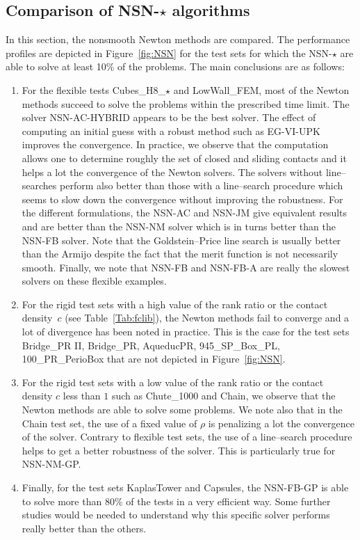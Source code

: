 \subsection{Comparison of {\sf NSN-$\star$} algorithms}

In this section,  the nonsmooth Newton methods  are compared.  The performance profiles are depicted in Figure~\ref{fig:NSN} for the test sets for which the {\sf NSN-$\star$} are able to solve at least 10\% of the problems. The main conclusions are as follows:
\begin{enumerate}
\item For the flexible tests Cubes\_H8\_$\star$ and LowWall\_FEM, most of the Newton methods succeed to solve the problems within the prescribed time limit. The solver {\sf NSN-AC-HYBRID} appears to be the best solver.  The effect of computing an initial guess with a robust method such as {\sf EG-VI-UPK}  improves the convergence. In practice, we observe that the computation allows one to determine roughly the set of closed and sliding contacts and it helps a lot the convergence of the Newton solvers. The solvers without line--searches perform also better than those with a line--search procedure which  seems to slow down the convergence without improving the robustness.  For the different formulations, the {\sf NSN-AC} and {\sf NSN-JM} give equivalent results and are better than the {\sf NSN-NM} solver which is in turns better than the {\sf NSN-FB} solver. Note that the Goldstein--Price line search is usually better than the Armijo despite the fact that the merit function is not necessarily smooth. Finally, we note that  {\sf NSN-FB}  and {\sf NSN-FB-A} are really the slowest solvers on these flexible examples.
\item For the rigid test sets with a high value of the rank ratio or the contact density~$c$ (see Table~\ref{Tab:fclib}), the Newton methods fail to converge and a lot of divergence has been noted in practice. This is the case for the test sets Bridge\_PR II, Bridge\_PR, AqueducPR, 945\_SP\_Box\_PL, 100\_PR\_PerioBox that are not depicted in Figure~\ref{fig:NSN}.
\item For the rigid test sets with a low value of the rank ratio or the contact density $c$ less than $1$ such as Chute\_1000 and Chain, we observe that the Newton methods are able to solve some problems. We note also that in the Chain test set, the use of a fixed value of $\rho$ is penalizing a lot the convergence of the solver. Contrary to flexible test sets, the use of a line--search procedure helps  to get a better robustness  of the solver. This is particularly true for {\sf NSN-NM-GP}.
\item Finally, for the test sets KaplasTower and Capsules, the {\sf NSN-FB-GP} is able to solve more than 80\% of the tests in a very efficient way. Some further studies would be needed to understand why this specific solver performs really better than the others.
\end{enumerate}
